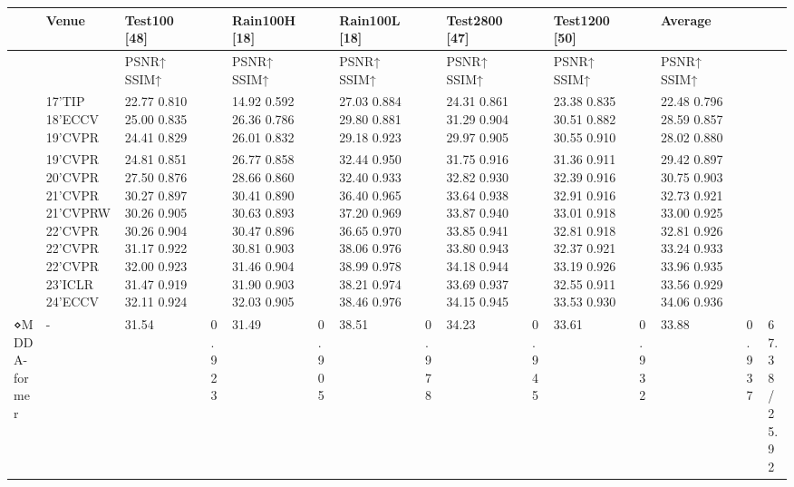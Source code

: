 \begin{tabular}{lllllllllllllll}
\toprule
 & Venue & Test100 [48] &  & Rain100H [18] &  & Rain100L [18] &  & Test2800 [47] &  & Test1200 [50] &  & Average &  &  \\
\midrule
 &  & PSNR↑ SSIM↑ &  & PSNR↑ SSIM↑ &  & PSNR↑ SSIM↑ &  & PSNR↑ SSIM↑ &  & PSNR↑ SSIM↑ &  & PSNR↑ SSIM↑ &  &  \\
 & 17’TIP 18’ECCV 19’CVPR & 22.77 0.810 25.00 0.835 24.41 0.829 &  & 14.92 0.592 26.36 0.786 26.01 0.832 &  & 27.03 0.884 29.80 0.881 29.18 0.923 &  & 24.31 0.861 31.29 0.904 29.97 0.905 &  & 23.38 0.835 30.51 0.882 30.55 0.910 &  & 22.48 0.796 28.59 0.857 28.02 0.880 &  &  \\
 & 19’CVPR 20’CVPR 21’CVPR 21’CVPRW 22’CVPR 22’CVPR 22’CVPR 23’ICLR 24’ECCV & 24.81 0.851 27.50 0.876 30.27 0.897 30.26 0.905 30.26 0.904 31.17 0.922 32.00 0.923 31.47 0.919 32.11 0.924 &  & 26.77 0.858 28.66 0.860 30.41 0.890 30.63 0.893 30.47 0.896 30.81 0.903 31.46 0.904 31.90 0.903 32.03 0.905 &  & 32.44 0.950 32.40 0.933 36.40 0.965 37.20 0.969 36.65 0.970 38.06 0.976 38.99 0.978 38.21 0.974 38.46 0.976 &  & 31.75 0.916 32.82 0.930 33.64 0.938 33.87 0.940 33.85 0.941 33.80 0.943 34.18 0.944 33.69 0.937 34.15 0.945 &  & 31.36 0.911 32.39 0.916 32.91 0.916 33.01 0.918 32.81 0.918 32.37 0.921 33.19 0.926 32.55 0.911 33.53 0.930 &  & 29.42 0.897 30.75 0.903 32.73 0.921 33.00 0.925 32.81 0.926 33.24 0.933 33.96 0.935 33.56 0.929 34.06 0.936 &  &  \\
⋄MDDA-former & - & 31.54 & 0.923 & 31.49 & 0.905 & 38.51 & 0.978 & 34.23 & 0.945 & 33.61 & 0.932 & 33.88 & 0.937 & 67.38/25.92 \\
\bottomrule
\end{tabular}
